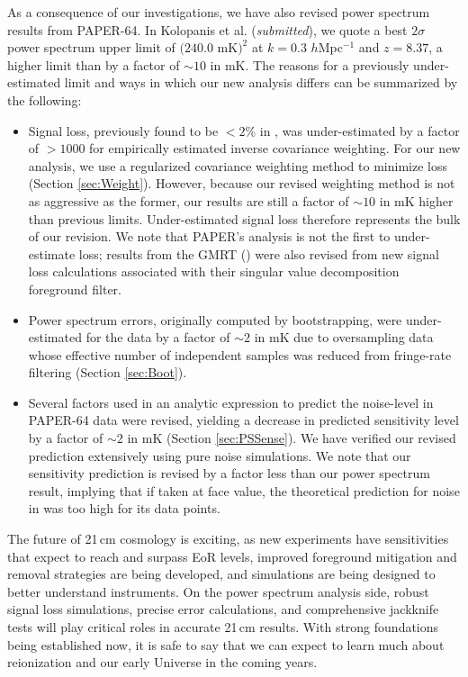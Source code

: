 \documentclass[preprint2,numberedappendix,tighten]{aastex6}  %
\begin{document}
As a consequence of our investigations, we have also revised power spectrum results from PAPER-64. In Kolopanis et al. (\textit{submitted}), we quote a best $2\sigma$ power spectrum upper limit of $(240.0$ mK$)^{2}$ at $k=0.3$ $h$Mpc$^{-1}$ and $z=8.37$, 
a higher limit than  by a factor of $\sim$$10$ in mK. The reasons for a previously under-estimated limit and 
ways in which our new analysis differs can be summarized by the following:

\begin{itemize}
\item Signal loss, previously found to be $<2\%$ in , was under-estimated by a factor of $>$$1000$ for empirically estimated inverse 
covariance weighting. For our new analysis, we use a regularized covariance weighting method to minimize loss (Section 
\ref{sec:Weight}). However, because our revised weighting method is not as aggressive as the former, our results are still a 
factor of $\sim10$ in mK higher than previous limits. Under-estimated signal loss therefore represents the bulk of our revision. We 
note that PAPER's analysis is not the first to under-estimate loss; results from the GMRT (\citealt{paciga_et_al2013}) were also 
revised from new signal loss calculations associated with their singular value decomposition foreground filter.
\item Power spectrum errors, originally computed by bootstrapping, were under-estimated for the data by a factor of $\sim2$ in mK due to oversampling data whose effective number of independent samples was reduced from fringe-rate filtering (Section \ref{sec:Boot}). 
\item Several factors used in an analytic expression to predict the noise-level in PAPER-64 data were revised, yielding a 
decrease in predicted sensitivity level by a factor of $\sim2$ in mK (Section \ref{sec:PSSense}). We have verified our revised 
prediction extensively using pure noise simulations. We note that our sensitivity prediction is revised by a factor less than our 
power spectrum result, implying that if taken at face value, the theoretical prediction for noise in  was too high for its data 
points.
\end{itemize}

The future of 21\,cm cosmology is exciting, as new experiments have sensitivities that expect to reach and surpass EoR levels, improved 
foreground mitigation and removal strategies are being developed, and simulations are being designed to better understand 
instruments. On the power spectrum analysis side, robust signal loss simulations, precise error calculations, and 
comprehensive jackknife tests will play critical roles in accurate 21\,cm results. With strong foundations being established now, it is safe to say that we can expect to learn much about reionization and our early Universe in the coming years.
\end{document}

